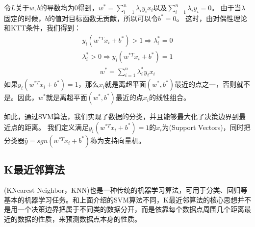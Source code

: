 \documentclass[letterpaper,10pt,english]{sphinxmanual}
\begin{document}
\sphinxAtStartPar
令\(L\)关于\({w},b\)的导数均为0得到，\({w}^* = \sum_{i=1}^n \lambda_i y_i {x_i}\)以及\(\sum_{i=1}^n \lambda_i y_i = 0\)。
由于当\(\lambda\)固定的时候，\(b\)的值对目标函数无贡献，所以可以令\(b^* = 0\)。
这时，由对偶性理论和KTT条件，我们得到：
\begin{equation}\label{equation:appendix_machine_learning_introduction/classic_machine_learning:appendix_machine_learning_introduction/classic_machine_learning:6}
\begin{split}y_i ({w}^{*T} {x_i} + b^*) > 1 \Rightarrow \lambda_i^* = 0\end{split}
\end{equation}\begin{equation}\label{equation:appendix_machine_learning_introduction/classic_machine_learning:appendix_machine_learning_introduction/classic_machine_learning:7}
\begin{split}\lambda_i^* > 0  \Rightarrow y_i ({w}^{*T} {x_i} + b^*) = 1\end{split}
\end{equation}\begin{equation}\label{equation:appendix_machine_learning_introduction/classic_machine_learning:appendix_machine_learning_introduction/classic_machine_learning:8}
\begin{split}{w}^* = \sum_{i=1}^n \lambda_i^* y_i {x_i}\end{split}
\end{equation}
\sphinxAtStartPar
如果\(y_i ({w}^{*T} {x_i} + b^*) = 1\)，那么\({x_i}\)就是离超平面\(({w}^*,b^*)\)最近的点之一，否则就不是。因此，\({w}^*\)就是离超平面\(({w}^*,b^*)\)最近的点\({x_i}\)的线性组合。

\sphinxAtStartPar
如此，通过SVM算法，我们实现了数据的分类，并且能够最大化了决策边界到最近点的距离。
我们定义满足\(y_i ({w}^{*T} {x_i} + b^*) = 1\)的\({x_i}\)为(Support
Vectors)，同时把分类器\(\hat{y}=sgn({w}^{*T} {x_i} + b^*)\)称为支持向量机。


\subsection{K最近邻算法}
\label{\detokenize{appendix_machine_learning_introduction/classic_machine_learning:k}}
\sphinxAtStartPar
{}(K\sphinxhyphen{}Nearest
Neighbor，KNN)也是一种传统的机器学习算法，可用于分类、回归等基本的机器学习任务。和上面介绍的SVM算法不同，K最近邻算法的核心思想并不是用一个决策边界把属于不同类的数据分开，而是依靠每个数据点周围几个距离最近的数据的性质，来预测数据点本身的性质。
\end{document}
